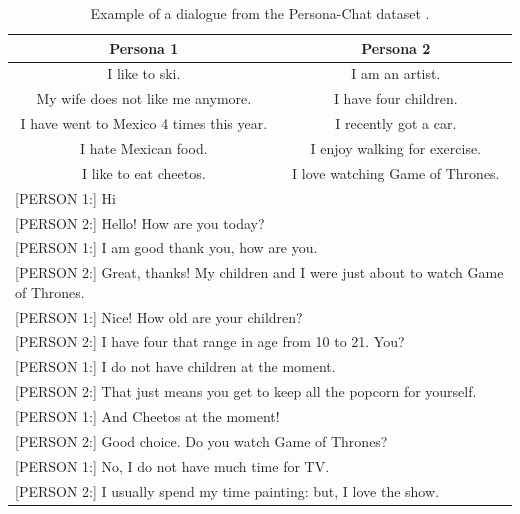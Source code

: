 \begin{table}[ht]
  \begin{tabular}{ |c|c| }
   \hline\hline
   \textbf{Persona 1} & \textbf{Persona 2}  \\ 
   \hline\hline
    I like to ski. & I am an artist. \\
    My wife does not like me anymore. & I have four children. \\
    I have went to Mexico 4 times this year. & I recently got a car. \\
    I hate Mexican food. & I enjoy walking for exercise. \\
    I like to eat cheetos. & I love watching Game of Thrones. \\
    \hline\hline
    \multicolumn{2}{l}{[PERSON 1:] Hi} \\
    \multicolumn{2}{l}{[PERSON 2:] Hello! How are you today?} \\
    \multicolumn{2}{l}{[PERSON 1:] I am good thank you, how are you.} \\
    \multicolumn{2}{l}{[PERSON 2:] Great, thanks! My children and I were just about to watch Game of Thrones.} \\
    \multicolumn{2}{l}{[PERSON 1:] Nice! How old are your children?} \\
    \multicolumn{2}{l}{[PERSON 2:] I have four that range in age from 10 to 21. You?} \\
    \multicolumn{2}{l}{[PERSON 1:] I do not have children at the moment.} \\
    \multicolumn{2}{l}{[PERSON 2:] That just means you get to keep all the popcorn for yourself.} \\
    \multicolumn{2}{l}{[PERSON 1:] And Cheetos at the moment!} \\
    \multicolumn{2}{l}{[PERSON 2:] Good choice. Do you watch Game of Thrones?} \\
    \multicolumn{2}{l}{[PERSON 1:] No, I do not have much time for TV.} \\
    \multicolumn{2}{l}{[PERSON 2:] I usually spend my time painting: but, I love the show.} \\
    \hline\hline
  \end{tabular}
  \caption{Example of a dialogue from the Persona-Chat dataset \cite{zhang2018personalizing}.}
\label{tab:persona_chat}
\end{table}

